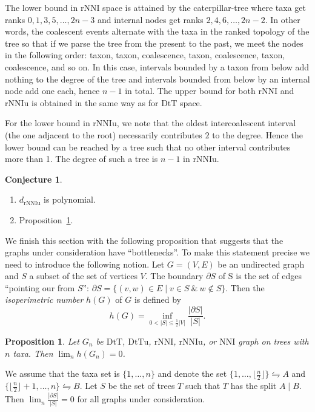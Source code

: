 \documentclass{amsart}
\newtheorem{proposition}[lemma]{Proposition}
\theoremstyle{definition}
\newtheorem{conjecture}[lemma]{Conjecture}
\newcommand{\nni}{\mathrm{NNI}}
\newcommand{\rnni}{\mathrm{rNNI}}
\newcommand{\rnniu}{\mathrm{rNNIu}}
\newcommand{\mdts}{\mathrm{DtT}}
\newcommand{\mdtsu}{\mathrm{DtTu}}
\begin{document}
The lower bound in $\rnni$ space is attained by the caterpillar-tree where taxa get ranks $0, 1, 3, 5, \ldots, 2n-3$ and internal nodes get ranks $2, 4, 6, \ldots, 2n-2$.
In other words, the coalescent events alternate with the taxa in the ranked topology of the tree so that if we parse the tree from the present to the past, we meet the nodes in the following order: taxon, taxon, coalescence, taxon, coalescence, taxon, coalescence, and so on.
In this case, intervals bounded by a taxon from below add nothing to the degree of the tree and intervals bounded from below by an internal node add one each, hence $n-1$ in total.
The upper bound for both $\rnni$ and $\rnniu$ is obtained in the same way as for $\mdts$ space.

For the lower bound in $\rnniu$, we note that the oldest intercoalescent interval (the one adjacent to the root) necessarily contributes $2$ to the degree.
Hence the lower bound can be reached by a tree such that no other interval contributes more than 1.
The degree of such a tree is $n-1$ in $\rnniu$.
\endproof

\begin{conjecture}
\begin{enumerate}[(1)]
The list of conjectures that would be nice to settle or refute in this paper:
\item $d_\rnniu$ is polynomial.
\item Proposition~\ref{isoperiPropo}.
\end{enumerate}
\end{conjecture}

We finish this section with the following proposition that suggests that the graphs under consideration have ``bottlenecks''.
To make this statement precise we need to introduce the following notion.
Let $G = (V, E)$ be an undirected graph and $S$ a subset of the set of vertices $V$.
The boundary $\partial S$ of S is the set of edges ``pointing our from $S$'': $\partial S = \{(v,w) \in E \mid v \in S ~\&~ w \notin S\}$.
Then the {\em isoperimetric number} $h(G)$ of $G$ is defined by
\[
h(G) = \inf\limits_{0 < |S| \leq \frac12|V|} \frac{|\partial S|}{|S|}.
\]

\begin{proposition}\label{isoperiPropo}
Let $G_n$ be $\mdts$, $\mdtsu$, $\rnni$, $\rnniu$, or $\nni$ graph on trees with $n$ taxa.
Then $\lim_n h(G_n) = 0$.
\end{proposition}

\proof
We assume that the taxa set is $\{1,\ldots,n\}$ and denote the set $\{1,\ldots,\lfloor \frac n2 \rfloor\} \leftrightharpoons A$ and $\{\lfloor \frac n2 \rfloor + 1,\ldots, n\} \leftrightharpoons B$.
Let $S$ be the set of trees $T$ such that $T$ has the split $A \mid B$.
Then $\lim_n \frac{|\partial S|}{|S|} = 0$ for all graphs under consideration.
\endproof
\end{document}

